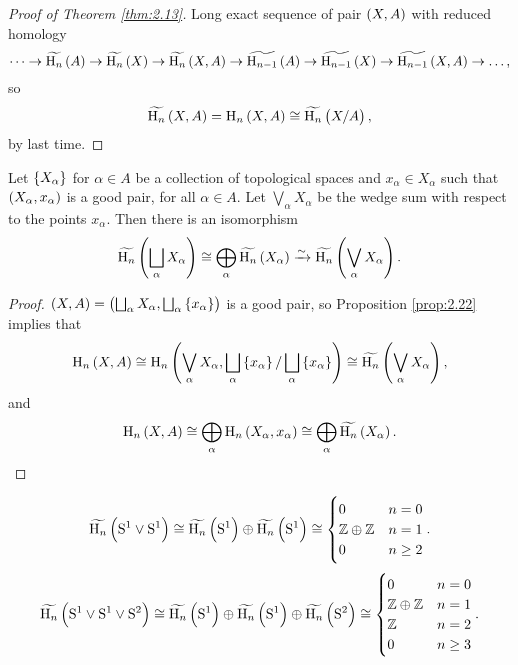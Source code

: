 \begin{proof}[Proof of Theorem \ref{thm:2.13}]
Long exact sequence of pair $ \br{X, A} $ with reduced homology
$$ \dots \to \widetilde{\H_n}\br{A} \to \widetilde{\H_n}\br{X} \to \widetilde{\H_n}\br{X, A} \to \widetilde{\H_{n - 1}}\br{A} \to \widetilde{\H_{n - 1}}\br{X} \to \widetilde{\H_{n - 1}}\br{X, A} \to \dots, $$
so
$$ \widetilde{\H_n}\br{X, A} = \H_n\br{X, A} \cong \widetilde{\H_n}\br{X / A}, $$
by last time.
\end{proof}


\begin{corollary}
Let $ \cbr{X_\alpha} $ for $ \alpha \in A $ be a collection of topological spaces and $ x_\alpha \in X_\alpha $ such that $ \br{X_\alpha, x_\alpha} $ is a good pair, for all $ \alpha \in A $. Let $ \bigvee_\alpha X_\alpha $ be the wedge sum with respect to the points $ x_\alpha $. Then there is an isomorphism
$$ \widetilde{\H_n}\br{\bigsqcup_\alpha X_\alpha} \cong \bigoplus_\alpha \widetilde{\H_n}\br{X_\alpha} \xrightarrow{\sim} \widetilde{\H_n}\br{\bigvee_\alpha X_\alpha}. $$
\end{corollary}

\pagebreak

\begin{proof}
$ \br{X, A} = \br{\bigsqcup_\alpha X_\alpha, \bigsqcup_\alpha \cbr{x_\alpha}} $ is a good pair, so Proposition \ref{prop:2.22} implies that
$$ \H_n\br{X, A} \cong \H_n\br{\bigvee_\alpha X_\alpha, \bigsqcup_\alpha \cbr{x_\alpha} / \bigsqcup_\alpha \cbr{x_\alpha}} \cong \widetilde{\H_n}\br{\bigvee_\alpha X_\alpha}, $$
and
$$ \H_n\br{X, A} \cong \bigoplus_\alpha \H_n\br{X_\alpha, x_\alpha} \cong \bigoplus_\alpha \widetilde{\H_n}\br{X_\alpha}. $$
\end{proof}

\begin{example*}
$$ \widetilde{\H_n}\br{\S^1 \vee \S^1} \cong \widetilde{\H_n}\br{\S^1} \oplus \widetilde{\H_n}\br{\S^1} \cong
\begin{cases}
0 & n = 0 \\
\ZZ \oplus \ZZ & n = 1 \\
0 & n \ge 2
\end{cases}.
$$
$$ \widetilde{\H_n}\br{\S^1 \vee \S^1 \vee \S^2} \cong \widetilde{\H_n}\br{\S^1} \oplus \widetilde{\H_n}\br{\S^1} \oplus \widetilde{\H_n}\br{\S^2} \cong
\begin{cases}
0 & n = 0 \\
\ZZ \oplus \ZZ & n = 1 \\
\ZZ & n = 2 \\
0 & n \ge 3
\end{cases}.
$$
\end{example*}

